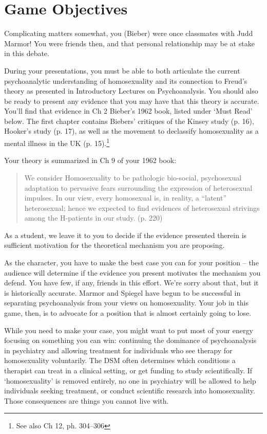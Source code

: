 \section{Game Objectives}
\label{gameobjectives}

Complicating matters somewhat, you (Bieber) were once classmates with Judd Marmor! You were friends then, and that personal relationship may be at stake in this debate.

During your presentations, you must be able to both articulate the current psychoanalytic understanding of homosexuality and its connection to Freud's theory as presented in Introductory Lectures on Psychoanalysis. You should also be ready to present any evidence that you may have that this theory is accurate. You'll find that evidence in Ch 2 Bieber's 1962 book, listed under `Must Read' below. The first chapter contains Biebers' critiques of the Kinsey study (p. 16), Hooker's study (p. 17), as well as the movement to declassify homosexuality as a mental illness in the UK (p. 15).\footnote{See also Ch 12, ph. 304--306}

Your theory is summarized in Ch 9 of your 1962 book:

\begin{quote}

We consider Homosexuality to be pathologic bio-social, psychosexual adaptation to pervasive fears surrounding the expression of heterosexual impulses. In our view, every homosexual is, in reality, a ``latent'' heterosexual; hence we expected to find evidences of heterosexual strivings among the H-patients in our study. (p. 220)
\end{quote}

As a student, we leave it to you to decide if the evidence presented therein is sufficient motivation for the theoretical mechanism you are proposing.

As the character, you have to make the best case you can for your position – the audience will determine if the evidence you present motivates the mechanism you defend. You have few, if any, friends in this effort. We're sorry about that, but it is historically accurate. Marmor and Spiegel have begun to be successful in separating psychoanalysis from your views on homosexuality. Your job in this game, then, is to advocate for a position that is almost certainly going to lose. 

While you need to make your case, you might want to put most of your energy focusing on something you can win: continuing the dominance of psychoanalysis in psychiatry and allowing treatment for individuals who see therapy for homosexuality voluntarily. The DSM often determines which conditions a therapist can treat in a clinical setting, or get funding to study scientifically. If `homosexuality' is removed entirely, no one in psychiatry will be allowed to help individuals seeking treatment, or conduct scientific research into homosexuality. Those consequences are things you cannot live with. 

